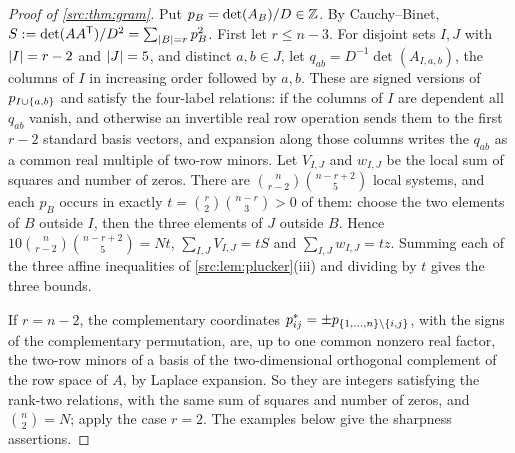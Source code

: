 \begin{proof}[Proof of \cref{src:thm:gram}]
Put $p_B=\det(A_B)/D\in\mathbb{Z}$. By Cauchy--Binet,
$S:=\det(AA^{\mathsf{T}})/D^2=\sum_{\lvert B\rvert=r}p_B^2$. First let $r\le n-3$. For disjoint sets
$I,J$ with $\lvert I\rvert=r-2$ and $\lvert J\rvert=5$, and distinct $a,b\in J$, let
$q_{ab}=D^{-1}\det(A_{I,a,b})$, the columns of $I$ in increasing order followed by $a,b$. These
are signed versions of $p_{I\cup\{a,b\}}$ and satisfy the four-label relations: if the
columns of $I$ are dependent all $q_{ab}$ vanish, and otherwise an invertible real row
operation sends them to the first $r-2$ standard basis vectors, and expansion along those
columns writes the $q_{ab}$ as a common real multiple of two-row minors. Let $V_{I,J}$ and
$w_{I,J}$ be the local sum of squares and number of zeros. There are
$\binom n{r-2}\binom{n-r+2}5$ local systems, and each $p_B$ occurs in exactly
$t=\binom r2\binom{n-r}3>0$ of them: choose the two elements of $B$ outside $I$, then the three
elements of $J$ outside $B$. Hence $10\binom n{r-2}\binom{n-r+2}5=Nt$,
$\sum_{I,J}V_{I,J}=tS$ and $\sum_{I,J}w_{I,J}=tz$. Summing each of the three affine
inequalities of \cref{src:lem:plucker}(iii) and dividing by $t$ gives the three bounds.

If $r=n-2$, the complementary coordinates $p^*_{ij}=\pm p_{\{1,\dots,n\}\setminus\{i,j\}}$,
with the signs of the complementary permutation, are, up to one common nonzero real factor, the
two-row minors of a basis of the two-dimensional orthogonal complement of the row space of $A$,
by Laplace expansion. So they are integers satisfying the rank-two relations, with the same
sum of squares and number of zeros, and $\binom n2=N$; apply the case $r=2$. The examples below
give the sharpness assertions.
\end{proof}

